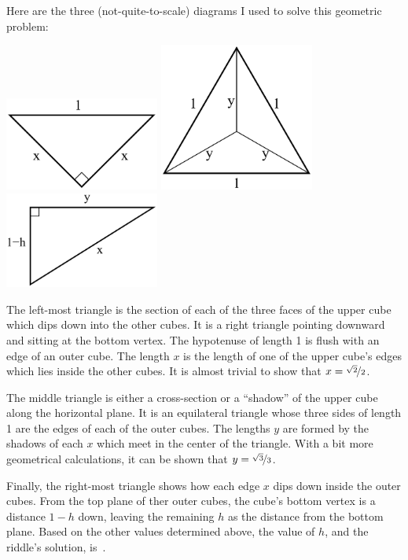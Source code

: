 \documentclass{article}
\begin{document}
Here are the three (not-quite-to-scale) diagrams I used to solve this geometric problem:

\vspace{0.2in}
\begin{center}
\includegraphics[width=2in]{triangle1.png}
\quad
\includegraphics[width=2in]{triangle2.png}
\quad
\includegraphics[width=2in]{triangle3.png}
\end{center}
\vspace{0.3in}

The left-most triangle is the section of each of the three faces of the upper cube which dips down into the other cubes.
It is a right triangle pointing downward and sitting at the bottom vertex.
The hypotenuse of length 1 is flush with an edge of an outer cube.
The length $x$ is the length of one of the upper cube's edges which lies inside the other cubes.
It is almost trivial to show that $x=\nicefrac{\sqrt{2}}{2}$.

The middle triangle is either a cross-section or a ``shadow'' of the upper cube along the horizontal plane.
It is an equilateral triangle whose three sides of length 1 are the edges of each of the outer cubes.
The lengths $y$ are formed by the shadows of each $x$ which meet in the center of the triangle.
With a bit more geometrical calculations, it can be shown that $y=\nicefrac{\sqrt{3}}{3}$.

Finally, the right-most triangle shows how each edge $x$ dips down inside the outer cubes.
From the top plane of ther outer cubes, the cube's bottom vertex is a distance $1-h$ down, leaving the remaining $h$ as the distance from the bottom plane.
Based on the other values determined above, the value of $h$, and the riddle's solution, is
\,.
\end{document}
